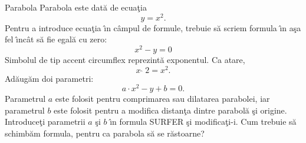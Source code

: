 \begin{surferPage}[Parabola]{Parabola}
Parabola este dat\u a de ecua\c tia \[y=x^2.\]
Pentru a introduce ecua\c tia \^\i n c\^ampul de formule, trebuie s\u a scriem formula \^\i n a\c sa fel \^\i nc\^at s\u a fie egal\u a cu zero:
\[x^2-y=0\]
Simbolul de tip accent circumflex reprezint\u a exponentul. Ca atare,
\[ x  \,\hat{\ } \, 2 =x^2.\]
Ad\u aug\u am doi parametri:
\[a \cdot x^2-y+b=0.\]
Parametrul $a$ este folosit pentru comprimarea sau dilatarea parabolei, iar parametrul $b$ este folosit pentru a modifica distan\c ta dintre parabol\u a \c si origine.
\newline
Introduce\c ti parametrii $a$ \c si $b$ \^\i n formula SURFER \c si modifica\c ti-i. Cum trebuie s\u a schimb\u am formula, pentru ca parabola s\u a se r\u astoarne?
\end{surferPage}